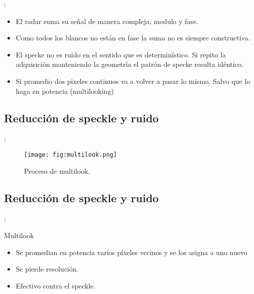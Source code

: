 \begin{frame}{\secname : \subsecname}
  \begin{itemize}
    \item El radar suma su señal de manera compleja, modulo y fase.
    \item Como todos los blancos no están en fase la suma no es siempre constructiva.
    \item El specke no es ruido en el sentido que es determinístico. Si repito la adquisición manteniendo la geometría el patrón de specke resulta idéntico.
    \item Si promedio dos pixeles continuos va a volver a pasar lo mismo. Salvo que lo haga en potencia (multilooking)
  \end{itemize}
\end{frame}
\subsection{Reducción de speckle y ruido}
\begin{frame}{\secname : \subsecname}
      \begin{figure}
        \centering
        \texttt{[image: fig:multilook.png]}
        \caption{Proceso de multilook.}
        \label{}
      \end{figure}
\end{frame}

\subsection{Reducción de speckle y ruido}
\begin{frame}{\secname : \subsecname}

   \begin{block}{Multilook}
     \begin{itemize}
       \item Se promedian en potencia varios píxeles vecinos y se los asigna a uno nuevo
       \item Se pierde resolución.
       \item Efectivo contra el speckle.
     \end{itemize}
   \end{block}

\end{frame}

